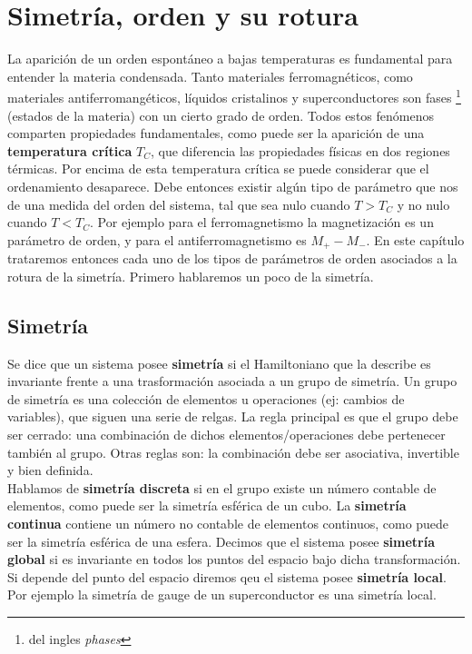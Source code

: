 \documentclass[12pt,a4paper]{book}
\numberwithin{equation}{section}
\numberwithin{figure}{section}
\begin{document}

\newpage

\chapter{Simetría, orden y su rotura}

La aparición de un orden espontáneo a bajas temperaturas es fundamental para entender la materia condensada. Tanto materiales ferromagnéticos, como materiales antiferromangéticos, líquidos cristalinos y superconductores son fases \footnote{del ingles \textit{phases}} (estados de la materia) con un cierto grado de orden. Todos estos fenómenos comparten propiedades fundamentales, como puede ser la aparición de una \textbf{temperatura crítica} $T_C$, que diferencia las propiedades físicas en dos regiones térmicas. Por encima de esta temperatura crítica se puede considerar que el ordenamiento desaparece. Debe entonces existir algún tipo de parámetro que nos de una medida del orden del sistema, tal que sea nulo cuando $T>T_C$ y no nulo cuando $T<T_C$. Por ejemplo para el ferromagnetismo la magnetización es un parámetro de orden, y para el antiferromagnetismo es $M_+-M_-$. En este capítulo trataremos entonces cada uno de los tipos de parámetros de orden asociados a la rotura de la simetría. Primero hablaremos un poco de la simetría.

\section{Simetría}

Se dice que un sistema posee \textbf{simetría} si el Hamiltoniano que la describe es invariante frente a una trasformación asociada a un grupo de simetría. Un grupo de simetría es una colección de elementos u operaciones (ej: cambios de variables), que siguen una serie de relgas. La regla principal es que el grupo debe ser cerrado: una combinación de dichos elementos/operaciones debe pertenecer también al grupo. Otras reglas son: la combinación debe ser asociativa, invertible y bien definida. \\

Hablamos de \textbf{simetría discreta} si en el grupo existe un número contable de elementos, como puede ser la simetría esférica de un cubo.  La \textbf{simetría continua} contiene un número no contable de elementos continuos, como puede ser la simetría esférica de una esfera. Decimos que el sistema posee \textbf{simetría global} si es invariante en todos los puntos del espacio bajo dicha transformación. Si depende del punto del espacio diremos qeu el sistema posee \textbf{simetría local}. Por ejemplo la simetría de gauge de un superconductor es una simetría local. \\
\end{document}
